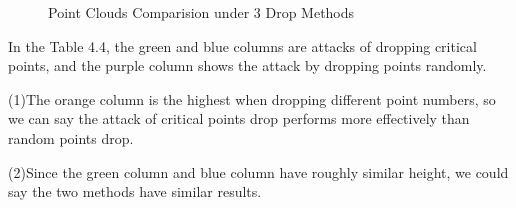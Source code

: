 \begin{figure}[htbp]
\centering
\caption{Point Clouds Comparision under 3 Drop Methods}
\label{fig:PC under 4 Noms Comparsion}
\end{figure}
In the Table 4.4, the green and blue columns are attacks of dropping critical points, and the purple column shows the attack by dropping points randomly. 

(1)The orange column is the highest when dropping different point numbers, so we can say the attack of critical points drop performs more effectively than random points drop.

(2)Since the green column and blue column have roughly similar height, we could say the two methods have similar results. 

